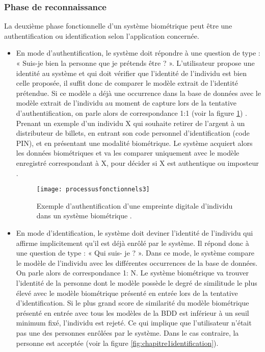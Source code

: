 \subsubsection{Phase de reconnaissance}
La deuxième phase fonctionnelle d’un système biométrique peut être une authentification ou identification selon l’application concernée.
\begin{itemize}
	\item En mode d’authentification, le système doit répondre à une question de type : « Suis-je bien la personne que je prétends être ? ». L’utilisateur propose une identité au système et qui doit vérifier que l’identité de l’individu est bien celle proposée, il suffit donc de comparer le modèle extrait de l’identité prétendue. Si ce modèle a déjà une occurrence dans la base de données avec le modèle extrait de l’individu au moment de capture lors de la tentative d’authentification, on parle alors de correspondance 1:1 (voir la figure \ref{fig:chapitre1authentification}) \citep{Perronnin2002}.
	\\ Prenant un exemple d'un individu X qui souhaite retirer de l’argent à un distributeur de billets, en entrant son code personnel d’identification (code PIN), et en présentant une modalité biométrique. Le système acquiert alors les données biométriques et va les comparer uniquement avec le modèle enregistré correspondant à X, pour décider si X est authentique ou imposteur \citep{meyer2009}.
	\begin{figure}[H]
		\centering
		\texttt{[image: processusfonctionnels3]}
		\caption{Exemple d'authentification d’une empreinte digitale d'individu dans un système biométrique \citep{meyer2009}.}
		\label{fig:chapitre1authentification}
	\end{figure}
	\item En mode d’identification, le système doit deviner l’identité de l’individu qui affirme implicitement qu’il est déjà enrôlé par le système. Il répond donc à une question de type : « Qui suis- je ? ». Dans ce mode, le système compare le modèle de l’individu avec les différentes occurrences de la base de données. On parle alors de correspondance 1: N.
	Le système biométrique va trouver l’identité de la personne dont le modèle possède le degré de similitude le plus élevé avec le modèle biométrique présenté en entrée lors de la tentative d’identification. Si le plus grand score de similarité du modèle biométrique présenté en entrée avec tous les modèles de la BDD est inférieur à un seuil minimum fixé, l’individu est rejeté. Ce qui implique que l’utilisateur n’était pas une des personnes enrôlées par le système. Dans le cas contraire, la personne est acceptée \citep{Perronnin2002} (voir la figure \ref{fig:chapitre1identification}).\\

\end{itemize}
